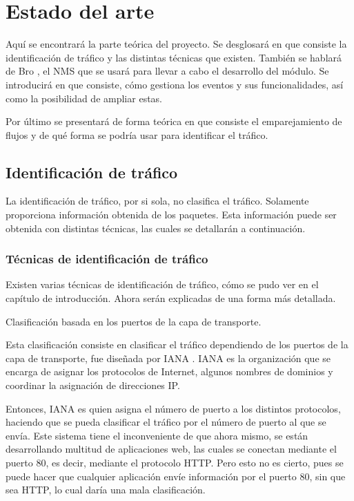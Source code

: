 \chapter{Estado del arte}

Aquí se encontrará la parte teórica del proyecto. Se desglosará en que consiste la identificación de tráfico y 
las distintas técnicas que existen. También se hablará de Bro \cite{broindex}, el NMS que se usará para 
llevar a cabo el desarrollo del módulo. Se introducirá en que consiste, cómo gestiona los eventos y sus 
funcionalidades, así como la posibilidad de ampliar estas.

\intro Por último se presentará de forma teórica en que consiste el emparejamiento de flujos y de qué forma 
se podría usar para identificar el tráfico.

\section{Identificación de tráfico}

La identificación de tráfico, por si sola, no clasifica el tráfico. Solamente proporciona información obtenida 
de los paquetes. Esta información puede ser obtenida con distintas técnicas, las cuales se detallarán a 
continuación.

\subsection{Técnicas de identificación de tráfico}

Existen varias técnicas de identificación de tráfico, cómo se pudo ver en el capítulo de introducción. Ahora 
serán explicadas de una forma más detallada.

\intro Clasificación basada en los puertos de la capa de transporte. \cite{iana}

\intro Esta clasificación consiste en clasificar el tráfico dependiendo de los puertos de la capa de transporte, 
fue diseñada por IANA \cite{ianaexplicacion}. IANA es la organización que se encarga de asignar los protocolos 
de Internet, algunos nombres de dominios y coordinar la asignación de direcciones IP. 

\intro Entonces, IANA es quien asigna el número de puerto a los distintos protocolos, haciendo que se pueda 
clasificar el tráfico por el número de puerto al que se envía. Este sistema tiene el inconveniente de que 
ahora mismo, se están desarrollando multitud de aplicaciones web, las cuales se conectan mediante el 
puerto 80, es decir, mediante el protocolo HTTP. Pero esto no es cierto, pues se puede hacer que cualquier 
aplicación envíe información por el puerto 80, sin que sea HTTP, lo cual daría una mala clasificación.


